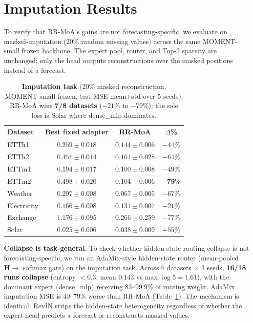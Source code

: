 \documentclass{article}
\begin{document}
\section{Imputation Results}
\label{app:imputation}

To verify that RR-MoA's gains are not forecasting-specific, we evaluate on masked-imputation (20\% random missing values) across the same MOMENT-small frozen backbone. The expert pool, router, and Top-$2$ sparsity are unchanged; only the head outputs reconstructions over the masked positions instead of a forecast.

\begin{table}[!htbp]
\centering
\caption{\textbf{Imputation task} (20\% masked reconstruction, MOMENT-small frozen, test MSE mean$\pm$std over 5 seeds). RR-MoA wins \textbf{7/8 datasets} ($-21\%$ to $-79\%$); the sole loss is Solar where dense\_mlp dominates.}
\label{tab:imputation}
\small
\begin{tabular}{@{}lccc@{}}
\toprule
Dataset & Best fixed adapter & \textbf{RR-MoA} & $\Delta$\% \\
\midrule
ETTh1       & $0.259 \pm 0.018$ & $\mathbf{0.144 \pm 0.006}$ & $-44\%$ \\
ETTh2       & $0.451 \pm 0.014$ & $\mathbf{0.161 \pm 0.028}$ & $-64\%$ \\
ETTm1       & $0.194 \pm 0.017$ & $\mathbf{0.100 \pm 0.008}$ & $-49\%$ \\
ETTm2       & $0.498 \pm 0.020$ & $\mathbf{0.104 \pm 0.006}$ & $\mathbf{-79\%}$ \\
Weather     & $0.207 \pm 0.008$ & $\mathbf{0.067 \pm 0.005}$ & $-67\%$ \\
Electricity & $0.166 \pm 0.008$ & $\mathbf{0.131 \pm 0.007}$ & $-21\%$ \\
Exchange    & $1.176 \pm 0.095$ & $\mathbf{0.266 \pm 0.259}$ & $-77\%$ \\
Solar       & $\mathbf{0.025 \pm 0.006}$ & $0.038 \pm 0.009$ & $+55\%$ \\
\bottomrule
\end{tabular}
\end{table}

\textbf{Collapse is task-general.} To check whether hidden-state routing collapse is not forecasting-specific, we run an AdaMix-style hidden-state router (mean-pooled $\mathbf{H} \to$ softmax gate) on the imputation task. Across 6 datasets $\times$ 3 seeds, \textbf{16/18 runs collapse} (entropy $< 0.3$; mean $0.143$ vs max $\log 5 = 1.61$), with the dominant expert (dense\_mlp) receiving $83$--$99.9\%$ of routing weight. AdaMix imputation MSE is $40$--$79\%$ worse than RR-MoA (Table~\ref{tab:imputation}). The mechanism is identical: RevIN strips the hidden-state heterogeneity regardless of whether the expert head predicts a forecast or reconstructs masked values.
\end{document}
